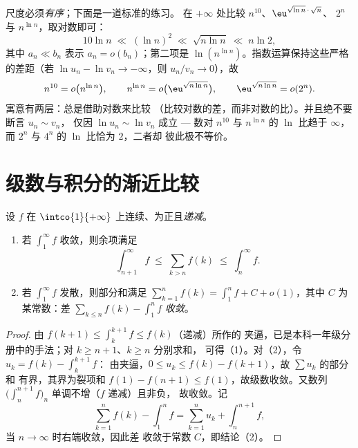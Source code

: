 \begin{example}[为一群“怪兽”排序]\label{ex:b2:comparison:ranking}
尺度必须\emph{有序}；下面是一道标准的练习。
在 $+\infty$ 处比较 $n^{10}$、$\eu^{\sqrt{\ln n}\,\cdot\,\sqrt n}$、
$2^n$ 与 $n^{\ln n}$，取对数即可：
\[
10\ln n
\;\ll\; (\ln n)^2
\;\ll\; \sqrt{n\ln n}
\;\ll\; n\ln 2 ,
\]
其中 $a_n \ll b_n$ 表示 $a_n = o(b_n)$；第二项是
$\ln(n^{\ln n})$。指数运算保持这些严格的差距（若
$\ln u_n - \ln v_n \to -\infty$，则 $u_n/v_n \to 0$），故
\[
n^{10} = o\bigl(n^{\ln n}\bigr),
\qquad
n^{\ln n} = o\bigl(\eu^{\sqrt{n\ln n}}\bigr),
\qquad
\eu^{\sqrt{n\ln n}} = o(2^n) .
\]
寓意有两层：总是借助对数来比较
（比较对数的差，而非对数的比）。并且绝不要断言 $u_n \sim v_n$，
仅因 $\ln u_n \sim \ln v_n$ 成立 --- 数对 $n^{10}$
与 $n^{\ln n}$ 的 $\ln$ 比趋于 $\infty$，而 $2^n$
与 $4^n$ 的 $\ln$ 比恰为 $2$，二者却
彼此极不等价。
\end{example}

\section{级数与积分的渐近比较}

\begin{theorem}\label{thm:b2:comparison:seriesintegral}
设 $f$ 在
$\intco{1}{+\infty}$ 上连续、为正且\emph{递减}。
\begin{enumerate}
  \item 若 $\int_1^{\infty} f$ 收敛，则余项满足
        \[
        \int_{n+1}^{\infty} f \;\leq\; \sum_{k > n} f(k) \;\leq\;
        \int_{n}^{\infty} f .
        \]
  \item 若 $\int_1^\infty f$ 发散，则部分和满足
        $\sum_{k=1}^{n} f(k) = \int_1^n f + C + o(1)$，其中
        $C$ 为某常数：差 $\sum_{k \leq n} f(k) -
        \int_1^n f$ \emph{收敛}。
\end{enumerate}
\end{theorem}

\begin{proof}
由 $f(k+1) \leq \int_k^{k+1} f \leq f(k)$（递减）所作的
夹逼，已是本科一年级分册中的手法；对 $k \geq n+1$、$k \geq n$ 分别求和，
可得（1）。对（2），令 $u_k = f(k) - \int_k^{k+1} f$：
由夹逼，$0 \leq u_k \leq f(k) - f(k+1)$，故 $\sum u_k$ 的部分和
有界，其界为裂项和 $f(1) - f(n+1) \leq
f(1)$，故级数收敛。又数列 $\bigl(\int_n^{n+1}
f\bigr)_n$ 单调不增（$f$ 递减）且非负，
故收敛。记
\[
\sum_{k=1}^{n} f(k) - \int_1^n f
= \sum_{k=1}^{n} u_k + \int_n^{n+1} f ,
\]
当 $n \to \infty$ 时右端收敛，因此差
收敛于常数 $C$，即结论（2）。
\end{proof}

